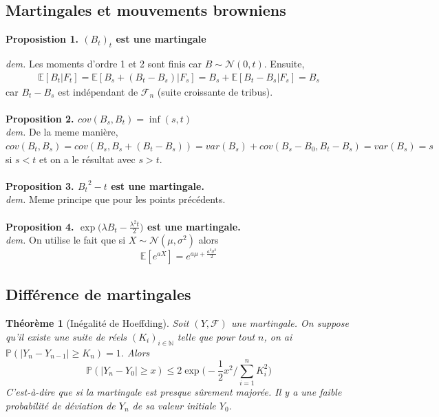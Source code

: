\documentclass[a4paper]{article}
\newtheorem{theorem}{Théorème}[section]
\begin{document}
\subsection{Martingales et mouvements browniens}

\textbf{Proposistion 1. $(B_t)_t$ est une martingale} 

\textit{dem.} Les moments d'ordre 1 et 2 sont finis car $B \sim \mathcal{N}(0, t)$. Ensuite, 
\begin{align}
    \mathbb{E}[B_t|F_t] = \mathbb{E}[B_s + (B_t-B_s)|F_s] = B_s + \mathbb{E}[B_t-B_s|F_s] = B_s
\end{align}
car $B_t-B_s$ est indépendant de $\mathcal{F}_n$ (suite croissante de tribus).
\\
\vspace{0.5mm}
\\
\textbf{Proposition 2. $cov(B_s, B_t) = \inf(s,t)$}
\\
\textit{dem.} De la meme manière, $cov(B_t, B_s) = cov(B_s, B_s + (B_t-B_s)) = var(B_s) + cov(B_s-B_0, B_t-B_s) = var(B_s) = s$ si $s<t$ et on a le résultat avec $s>t$.
\\
\vspace{0.5mm}
\\
\textbf{Proposition 3. ${B_t}^2 -t$ est une martingale.}
\\
\textit{dem.} Meme principe que pour les points précédents.
\\
\vspace{0.5mm}
\\
\textbf{Proposition 4. $\exp\bigg( \lambda B_t - \frac{\lambda ^2 t}{2} \bigg)$ est une martingale.}
\\
\textit{dem.} On utilise le fait que si $X \sim \mathcal{N}(\mu, \sigma ^2)$ alors
\begin{equation}
    \mathbb{E}[e^{aX}] = e^{a\mu + \frac{a^2\sigma^2}{2}}
\end{equation}
\subsection{Différence de martingales}
\begin{theorem}[Inégalité de Hoeffding] Soit $(Y, \mathcal{F})$ une martingale. On suppose qu'il existe une suite de réels $(K_i)_{i\in \mathbb{N}}$ telle que pour tout $n$, on ai $\mathbb{P}(|Y_n - Y_{n-1}| \geq K_n) =1$. Alors
\begin{equation}
    \mathbb{P}(|Y_n - Y_0| \geq x) \leq 2\exp{\bigg(-\frac{1}{2}x^2\bigg/ \sum_{i=1}^{n} K_i ^2\bigg)}
\end{equation}
C'est-à-dire que si la martingale est presque sûrement majorée. Il y a une faible probabilité de déviation de $Y_n$ de sa valeur initiale $Y_0$.
\end{theorem}
\end{document}
